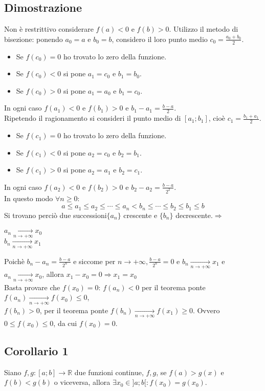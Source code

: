 \subsection{Dimostrazione}
Non \`e restrittivo considerare $f(a)<0$ e $f(b)>0$. Utilizzo il metodo di bisezione: ponendo $a_0=a$ e $b_0=b$, considero il loro punto medio $c_0=\frac{a_0+b_0}{2}$.
\begin{itemize}
\item Se $f(c_0)=0$ ho trovato lo zero della funzione.
\item Se $f(c_0)<0$ si pone $a_1=c_0$ e $b_1=b_0$.
\item Se $f(c_0)>0$ si pone $a_1=a_0$ e $b_1=c_0$.
\end{itemize}
In ogni caso $f(a_1)<0$ e $f(b_1)>0$ e $b_1-a_1=\frac{b-a}{2}$.\\
Ripetendo il ragionamento si consideri il punto medio di $[a_1;b_1]$, cio\`e $c_1=\frac{b_1+a_1}{2}$.
\begin{itemize}
\item Se $f(c_1)=0$ ho trovato lo zero della funzione.
\item Se $f(c_1)<0$ si pone $a_2=c_0$ e $b_2=b_1$.
\item Se $f(c_1)>0$ si pone $a_2=a_1$ e $b_2=c_1$.
\end{itemize}
In ogni caso $f(a_2)<0$ e $f(b_2)>0$ e $b_2-a_2=\frac{b-a}{2^2}$.\\
In questo modo $\forall n\ge 0$:\\
\begin{equation}
a\le a_1\le a_2\le\cdots\le a_n<b_n\le\cdots\le b_2\le b_1\le b
\end{equation}
Si trovano perci\`o due successioni$\{a_n\}$ crescente e $\{b_n\}$ decrescente.$\Rightarrow$
\begin{center}
$a_n\xrightarrow[n\rightarrow +\infty]{}x_0$\\
$b_n\xrightarrow[n\rightarrow +\infty]{}x_1$
\end{center}
Poich\`e $b_n-a_n=\frac{b-a}{2^n}$ e siccome per $n\rightarrow+\infty,\frac{b-a}{2^n}=0$ e $b_n\xrightarrow[n\rightarrow+\infty]{} x_1$ e 
$a_n\xrightarrow[n\rightarrow+\infty]{}x_0$, allora $x_1-x_0=0\Rightarrow x_1=x_0$\\
Basta provare che $f(x_0)=0$: $f(a_n)<0$ per il teorema ponte $f(a_n)\xrightarrow[n\rightarrow+\infty]{} f(x_0)\le 0$,\\
$f(b_n)>0$, per il teorema ponte $f(b_n)\xrightarrow[n\rightarrow+\infty]{}f(x_1)\ge 0$.
Ovvero $0\le f(x_0)\le 0$, da cui $f(x_0)=0$.
\subsection{Corollario 1}
Siano $f, g:[a;b]\rightarrow\mathbb{R}$ due funzioni continue, $f,g$, se $f(a)>g(x)$ e $f(b)<g(b)$ o viceversa, allora $\exists x_0\in]a;b[:f(x_0)=g(x_0)$.
